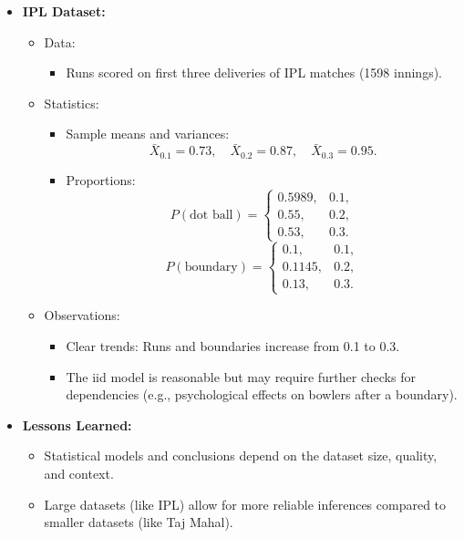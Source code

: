 \documentclass{article}
\begin{document}
\begin{itemize}
  \item \textbf{IPL Dataset:}
    \begin{itemize}
      \item Data:
        \begin{itemize}
          \item Runs scored on first three deliveries of IPL matches (1598 innings).
        \end{itemize}
      \item Statistics:
        \begin{itemize}
          \item Sample means and variances:
            \[
              \bar{X}_{0.1} = 0.73, \quad \bar{X}_{0.2} = 0.87, \quad \bar{X}_{0.3} = 0.95.
            \]
          \item Proportions:
            \[
              P(\text{dot ball}) =
              \begin{cases}
                0.5989, & 0.1, \\
                0.55, & 0.2, \\
                0.53, & 0.3.
              \end{cases}
            \]
            \[
              P(\text{boundary}) =
              \begin{cases}
                0.1, & 0.1, \\
                0.1145, & 0.2, \\
                0.13, & 0.3.
              \end{cases}
            \]
        \end{itemize}
      \item Observations:
        \begin{itemize}
          \item Clear trends: Runs and boundaries increase from 0.1 to 0.3.
          \item The iid model is reasonable but may require further checks for dependencies (e.g., psychological effects on bowlers after a boundary).
        \end{itemize}
    \end{itemize}

  \item \textbf{Lessons Learned:}
    \begin{itemize}
      \item Statistical models and conclusions depend on the dataset size, quality, and context.
      \item Large datasets (like IPL) allow for more reliable inferences compared to smaller datasets (like Taj Mahal).
    \end{itemize}
\end{itemize}
\end{document}
